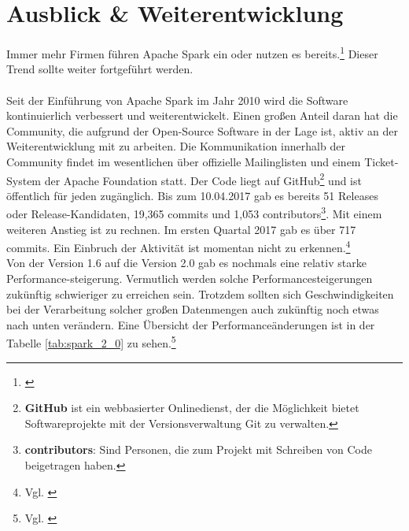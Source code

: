 \newpage
\chapter{Ausblick \& Weiterentwicklung} 

Immer mehr Firmen führen Apache Spark ein oder nutzen es bereits.\footnote{\cite{HEISEBIGDATA}} Dieser Trend sollte weiter fortgeführt werden.
\\ \\
\noindent
Seit der Einführung von Apache Spark im Jahr 2010 wird die Software kontinuierlich verbessert und weiterentwickelt. 
Einen großen Anteil daran hat die Community, die aufgrund der Open-Source Software in der Lage ist, aktiv an der Weiterentwicklung mit zu arbeiten. 
Die Kommunikation innerhalb der Community findet im wesentlichen über offizielle Mailinglisten und einem Ticket-System der Apache Foundation statt.
Der Code liegt auf GitHub\footnote{\textbf{GitHub} ist ein webbasierter Onlinedienst, der die Möglichkeit bietet Softwareprojekte mit der Versionsverwaltung Git zu verwalten.} und ist öffentlich für jeden zugänglich. 
Bis zum 10.04.2017 gab es bereits 51 Releases oder Release-Kandidaten, 19,365 commits und 1,053 contributors\footnote{\textbf{contributors}: Sind Personen, die zum Projekt mit Schreiben von Code beigetragen haben.}.
Mit einem weiteren Anstieg ist zu rechnen. Im ersten Quartal 2017 gab es über 717 commits. Ein Einbruch der Aktivität ist momentan nicht zu erkennen.\footnote{Vgl. \cite{GITHUB}} \\


\noindent
Von der Version 1.6 auf die Version 2.0 gab es nochmals eine relativ starke Performance-steigerung. Vermutlich werden solche Performancesteigerungen zukünftig schwieriger zu erreichen sein. Trotzdem sollten sich  Geschwindigkeiten bei der Verarbeitung solcher großen Datenmengen auch zukünftig noch etwas nach unten verändern. Eine Übersicht der Performanceänderungen ist in der Tabelle \ref{tab:spark_2_0} zu sehen.\footnote{Vgl. \cite{DATABRICK_SPARK_2_0}}


